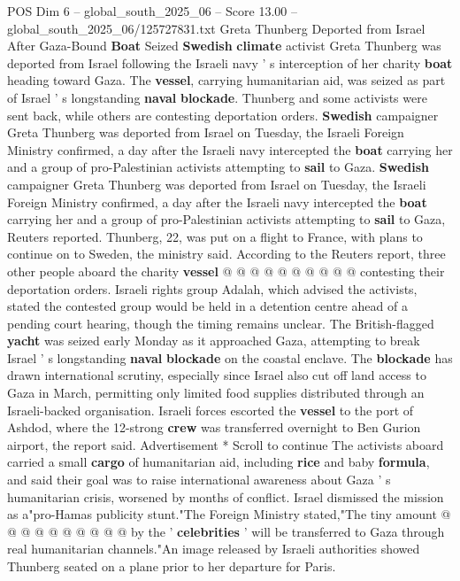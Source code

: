 \begin{textsample}{POS Dim 6 – global\_south\_2025\_06 – Score 13.00 – global\_south\_2025\_06/125727831.txt}  \label{ex:f6_pos_018}
Greta Thunberg Deported from Israel After Gaza-Bound \textbf{Boat} Seized \textbf{Swedish} \textbf{climate} activist Greta Thunberg was deported from Israel following the Israeli navy ' s interception of her charity \textbf{boat} heading toward Gaza.
The \textbf{vessel}, carrying humanitarian aid, was seized as part of Israel ' s longstanding \textbf{naval} \textbf{blockade}.
Thunberg and some activists were sent back, while others are contesting deportation orders. \textbf{Swedish} campaigner Greta Thunberg was deported from Israel on Tuesday, the Israeli Foreign Ministry confirmed, a day after the Israeli navy intercepted the \textbf{boat} carrying her and a group of pro-Palestinian activists attempting to \textbf{sail} to Gaza. \textbf{Swedish} campaigner Greta Thunberg was deported from Israel on Tuesday, the Israeli Foreign Ministry confirmed, a day after the Israeli navy intercepted the \textbf{boat} carrying her and a group of pro-Palestinian activists attempting to \textbf{sail} to Gaza, Reuters reported.
Thunberg, 22, was put on a flight to France, with plans to continue on to Sweden, the ministry said.
According to the Reuters report, three other people aboard the charity \textbf{vessel} @ @ @ @ @ @ @ @ @ @ contesting their deportation orders.
Israeli rights group Adalah, which advised the activists, stated the contested group would be held in a detention centre ahead of a pending court hearing, though the timing remains unclear.
The British-flagged \textbf{yacht} was seized early Monday as it approached Gaza, attempting to break Israel ' s longstanding \textbf{naval} \textbf{blockade} on the coastal enclave.
The \textbf{blockade} has drawn international scrutiny, especially since Israel also cut off land access to Gaza in March, permitting only limited food supplies distributed through an Israeli-backed organisation.
Israeli forces escorted the \textbf{vessel} to the port of Ashdod, where the 12-strong \textbf{crew} was transferred overnight to Ben Gurion airport, the report said.
Advertisement * Scroll to continue The activists aboard carried a small \textbf{cargo} of humanitarian aid, including \textbf{rice} and baby \textbf{formula}, and said their goal was to raise international awareness about Gaza ' s humanitarian crisis, worsened by months of conflict.
Israel dismissed the mission as a"pro-Hamas publicity stunt."The Foreign Ministry stated,"The tiny amount @ @ @ @ @ @ @ @ @ @ by the ' \textbf{celebrities} ' will be transferred to Gaza through real humanitarian channels."An image released by Israeli authorities showed Thunberg seated on a plane prior to her departure for Paris.

\end{textsample}
